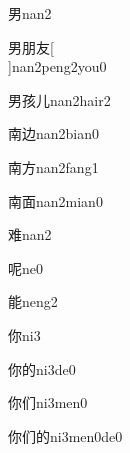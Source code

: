 \begin{verbete}[7]{男}{nan2}
\end{verbete}

\begin{verbete}[7;8;4]{男朋友}[\\]{nan2peng2you0}
\end{verbete}

\begin{verbete}[7;9;2]{男孩儿}{nan2hair2}
\end{verbete}

\begin{verbete}[9;5]{南边}{nan2bian0}
\end{verbete}

\begin{verbete}[9;4]{南方}{nan2fang1}
\end{verbete}

\begin{verbete}[9;9]{南面}{nan2mian0}
\end{verbete}

\begin{verbete}[10]{难}{nan2}
\end{verbete}

\begin{verbete}[8]{呢}{ne0}
\end{verbete}

\begin{verbete}[10]{能}{neng2}
\end{verbete}

\begin{verbete}[7]{你}{ni3}
\end{verbete}

\begin{verbete}[7;8]{你的}{ni3de0}
\end{verbete}

\begin{verbete}[7;5]{你们}{ni3men0}
\end{verbete}

\begin{verbete}[7;5]{你们的}{ni3men0de0}
\end{verbete}


